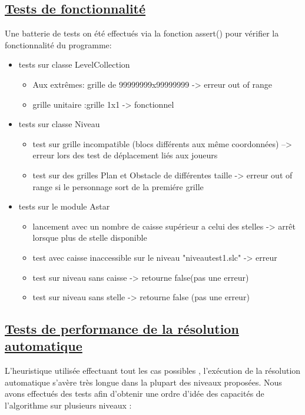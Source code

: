 \documentclass{article}
\begin{document}
\begin{center}
\section{\underline{Tests de fonctionnalité}}
\end{center}
	\vspace{2cm}
	Une batterie de tests on été effectués via la fonction assert() pour vérifier la fonctionnalité du programme:
\vspace{1cm}
	\begin{itemize}

	\item tests sur classe LevelCollection
		\begin{itemize}
		\item Aux extrêmes: grille de 99999999x99999999 -> erreur out of range
		\item grille unitaire :grille 1x1 -> fonctionnel
		\end{itemize}
		\vspace{0.5cm}
	\item tests sur classe Niveau
		\begin{itemize}
		\item test sur grille incompatible (blocs différents aux même coordonnées) --> erreur lors des test de déplacement liés aux joueurs
		\item test sur des grilles Plan et Obstacle de différentes taille -> erreur out of range si le personnage sort de la premiére grille
		\end{itemize}
		\vspace{0.5cm}
	\item tests sur le module Astar
		\begin{itemize}
		\item lancement avec un nombre de caisse supérieur a celui des stelles  -> arrêt lorsque plus de stelle disponible
		\item test avec caisse inaccessible sur le niveau "niveautest1.slc" -> erreur
		\item test sur niveau sans caisse -> retourne false(pas une erreur)
		\item test sur niveau sans stelle -> retourne false (pas une erreur) 
		\end{itemize}
	\end{itemize}
\newpage
	
	\begin{center}

	\section{\underline{Tests de performance de la résolution automatique}}
	\vspace{1 cm}
	L'heuristique utilisée effectuant tout les cas possibles , l'exécution de la résolution automatique s'avère très longue dans la plupart des niveaux proposées. Nous avons effectués des tests afin d'obtenir une ordre d'idée des capacités de l'algorithme sur plusieurs niveaux :
	\end{center}
	\vspace{2 cm}
	
\end{document}
